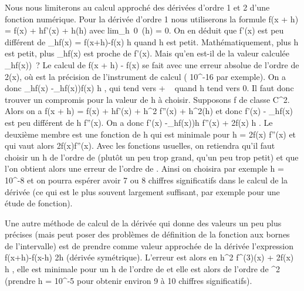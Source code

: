 \documentclass[]{article}
\begin{document}
Nous nous limiterons au calcul approché des dérivées d'ordre 1 et 2
d'une fonction numérique. Pour la dérivée d'ordre 1 nous utiliserons la
formule f(x + h) = f(x) + hf'(x) + h\epsilon(h) avec
lim\_h\rightarrow~0~\epsilon(h) = 0. On en déduit que
f'(x) est peu différent de \Delta\_hf(x) = f(x+h)-f(x)
\over h quand h est petit. Mathématiquement, plus h est
petit, plus \Delta\_hf(x) est proche de f'(x). Mais qu'en est-il de
la valeur calculée \overline\Delta\_hf(x))~? Le
calcul de f(x + h) - f(x) se fait avec une erreur absolue de l'ordre de
2\deltaf(x), où \delta est la précision de l'instrument de calcul (
10^-16 par exemple). On a donc \textbar{}\Delta\_hf(x)
-\overline\Delta\_hf(x))\textbar{}\delta\textbar{}f(x)\textbar{} \over h , qui tend vers + \infty~
quand h tend vers 0. Il faut donc trouver un compromis pour la valeur de
h à choisir. Supposons f de classe C^2. Alors on a f(x + h) =
f(x) + hf'(x) + h^2  f''(x) +
h^2\epsilon(h) et donc \textbar{}f'(x) - \Delta\_hf(x)\textbar{}
est peu différent de  h 
\textbar{}f''(x)\textbar{}. On a donc \textbar{}f'(x)
-\overline\Delta\_hf(x))\textbar{}\leq h
 \textbar{}f''(x)\textbar{} +
2\delta\textbar{}f(x)\textbar{} \over h . Le deuxième membre
est une fonction de h qui est minimale pour h =
2\sqrt \delta\textbar{}f(x)\textbar{} \over
\textbar{}f''(x)\textbar{}  et qui vaut alors
2\sqrt\delta\textbar{}f(x)f''(x)\textbar{}. Avec les
fonctions usuelles, on retiendra qu'il faut choisir un h de l'ordre de
\sqrt\delta (plutôt un peu trop grand, qu'un peu trop
petit) et que l'on obtient alors une erreur de l'ordre de
\sqrt \delta. Ainsi on choisira par exemple h =
10^-8 et on pourra espérer avoir 7 ou 8 chiffres
significatifs dans le calcul de la dérivée (ce qui est le plus souvent
largement suffisant, par exemple pour une étude de fonction).

Une autre méthode de calcul de la dérivée qui donne des valeurs un peu
plus précises (mais peut poser des problèmes de définition de la
fonction aux bornes de l'intervalle) est de prendre comme valeur
approchée de la dérivée l'expression  f(x+h)-f(x-h)
\over 2h (dérivée symétrique). L'erreur est alors en 
h^2 
\textbar{}f^(3)(x)\textbar{} + 2\delta\textbar{}f(x)\textbar{}
\over h , elle est minimale pour un h de l'ordre de
\of\delta et elle est alors de
l'ordre de \delta^2 (prendre h = 10^-5 pour obtenir
environ 9 à 10 chiffres significatifs).
\end{document}
